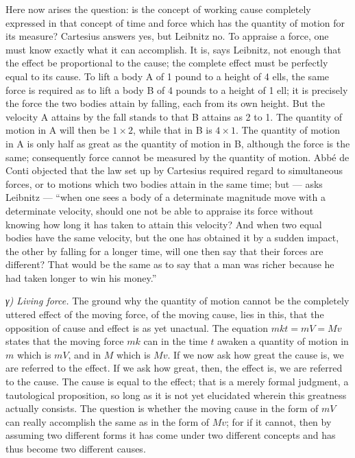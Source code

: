 \documentclass[12pt,a4paper]{book}
\newcommand{\subrunin}[1]{\emph{#1}\hspace{0.4em}}
\begin{document}
Here now arises the question: is the concept of working cause completely expressed in that
concept of time and force which has the quantity of motion for its measure? Cartesius
answers yes, but Leibnitz no. To appraise a force, one must know exactly what it can
accomplish. It is, says Leibnitz, not enough that the effect be proportional to the cause;
the complete effect must be
perfectly equal to its cause. To lift a body A of 1 pound to a height of 4 ells, the same
force is required as to lift a body B of 4 pounds to a height of 1 ell; it is precisely the
force the two bodies attain by falling, each from its own height. But the velocity A
attains by the fall stands to that B attains as 2 to 1.
The quantity of motion in A will then be $1 \times 2$, while that in B is $4 \times 1$. The
quantity of motion in A is only half as great as the quantity of motion in B, although the
force is the same; consequently force cannot be measured by the quantity of motion. Abbé de
Conti objected that the law set up by Cartesius required regard to simultaneous forces, or
to motions which two bodies attain in the same time; but --- asks Leibnitz --- ``when one
sees a body of a determinate magnitude move with a determinate velocity, should one not be
able to appraise its force without knowing how long it has taken to attain this velocity?
And when two equal bodies have the same velocity, but the one has obtained it by a sudden
impact, the other by falling for a longer time, will one then say that their forces are
different? That would be the same as to say that a man was richer because he had taken
longer to win his money.''

\subrunin{γ) Living force.} The ground why the quantity of motion cannot be the completely
uttered effect of the moving force, of the moving cause, lies in this, that the opposition
of cause and effect is as yet unactual. The equation $mkt = mV = Mv$ states that the moving
force $mk$ can in the time $t$ awaken a quantity of motion in $m$ which is $mV$, and in $M$
which is $Mv$. If we now ask how great the cause is, we are referred to the effect. If we
ask how great, then, the effect is, we are referred to the cause. The cause is equal to the
effect; that is a merely formal judgment, a tautological proposition, so long as it is not
yet elucidated
wherein this greatness actually consists. The question is whether the moving cause in the
form of $mV$ can really accomplish the same as in the form of $Mv$; for if it cannot, then
by assuming two different forms it has come under two different concepts and has thus
become two different causes.
\end{document}
